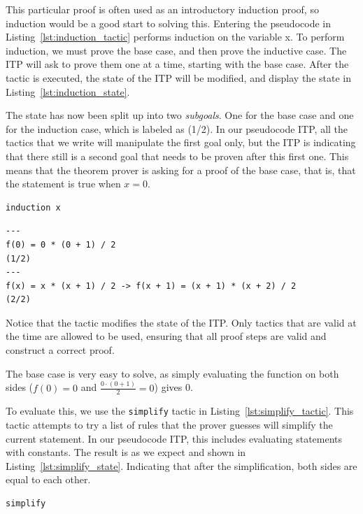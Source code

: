 \documentclass[
]{article}
\newcommand{\passthrough}[1]{#1}
\begin{document}
This particular proof is often used as an introductory induction proof,
so induction would be a good start to solving this. Entering the
pseudocode in Listing~\ref{lst:induction_tactic} performs induction on
the variable x. To perform induction, we must prove the base case, and
then prove the inductive case. The ITP will ask to prove them one at a
time, starting with the base case. After the tactic is executed, the
state of the ITP will be modified, and display the state in
Listing~\ref{lst:induction_state}.

The state has now been split up into two \emph{subgoals}. One for the
base case and one for the induction case, which is labeled as (1/2). In
our pseudocode ITP, all the tactics that we write will manipulate the
first goal only, but the ITP is indicating that there still is a second
goal that needs to be proven after this first one. This means that the
theorem prover is asking for a proof of the base case, that is, that the
statement is true when \(x = 0\).

\begin{lstlisting}[caption={Running the induction tactic}, label=lst:induction_tactic]
induction x
\end{lstlisting}

\begin{lstlisting}[caption={State after the induction tactic}, label=lst:induction_state]
---
f(0) = 0 * (0 + 1) / 2
(1/2)
---
f(x) = x * (x + 1) / 2 -> f(x + 1) = (x + 1) * (x + 2) / 2
(2/2)
\end{lstlisting}

Notice that the tactic modifies the state of the ITP. Only tactics that
are valid at the time are allowed to be used, ensuring that all proof
steps are valid and construct a correct proof.

The base case is very easy to solve, as simply evaluating the function
on both sides (\(f(0) = 0\) and \(\frac {0 \cdot (0 + 1)}{2} = 0\))
gives 0.

To evaluate this, we use the \passthrough{\lstinline!simplify!} tactic
in Listing~\ref{lst:simplify_tactic}. This tactic attempts to try a list
of rules that the prover guesses will simplify the current statement. In
our pseudocode ITP, this includes evaluating statements with constants.
The result is as we expect and shown in
Listing~\ref{lst:simplify_state}. Indicating that after the
simplification, both sides are equal to each other.

\begin{lstlisting}[caption={Running the simplify tactic}, label=lst:simplify_tactic]
simplify
\end{lstlisting}
\end{document}
